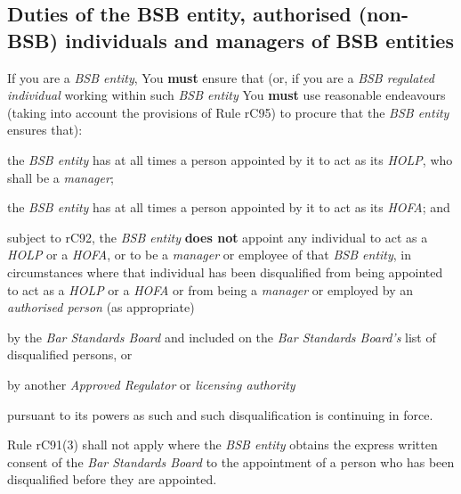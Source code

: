 

\subsection{Duties of the BSB entity, authorised (non-BSB) individuals and
managers of BSB entities}


If you are a \emph{BSB entity}, You \textcolor{myred}{\textbf{must}} ensure that (or, if you are a
\emph{BSB regulated individual} working within such \emph{BSB entity}
You \textcolor{myred}{\textbf{must}} use reasonable endeavours (taking into account the provisions
of Rule rC95) to procure that the \emph{BSB entity} ensures that):
\begin{numlist}\item the \emph{BSB entity} has at all times a person appointed by it to
act as its \emph{HOLP}, who shall be a \emph{manager};
\item the \emph{BSB entity} has at all times a person appointed by it to
act as its \emph{HOFA}; and
\item subject to rC92, the \emph{BSB entity} \textcolor{myred}{\textbf{does not}} appoint any
individual to act as a \emph{HOLP} or a \emph{HOFA}, or to be a
\emph{manager} or employee of that \emph{BSB entity}, in circumstances
where that individual has been disqualified from being appointed to act
as a \emph{HOLP} or a \emph{HOFA} or from being a \emph{manager} or
employed by an \emph{authorised person} (as appropriate) 

\begin{romlist}\item by the
\emph{Bar Standards Board} and included on the \emph{Bar Standards
Board's} list of disqualified persons, or \item by another \emph{Approved
Regulator} or \emph{licensing authority} \end{romlist}pursuant to its powers as such
and such disqualification is continuing in force.

\end{numlist}


Rule rC91(3) shall not apply where the \emph{BSB entity} obtains the
express written consent of the \emph{Bar Standards Board} to the
appointment of a person who has been disqualified before they are
appointed.


